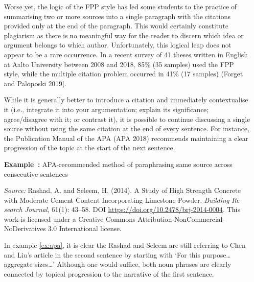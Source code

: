 \documentclass[english, 12pt, a4paper, sci, utf8, a-2b, online]{aaltothesis}
\begin{document}
Worse yet, the logic of the FPP style has led some students to the practice of 
summarising two or more sources into a single paragraph with the citations 
provided only at the end of the paragraph. This would certainly constitute 
plagiarism as there is no meaningful way for the reader to discern which idea or
argument belongs to which author. Unfortunately, this logical leap does not 
appear to be a rare occurrence. In a recent survey of 41 theses written in 
English at Aalto University between 2008 and 2018, 85\% (35 samples) used the 
FPP style, while the multiple citation problem occurred in 41\% (17 samples) 
(Forget and Paloposki 2019).

While it is generally better to introduce a citation and immediately 
contextualise it (i.e., integrate it into your argumentation; explain its 
significance; agree/disagree with it; or contrast it), it is possible to 
continue discussing a single source without using the same citation at the end 
of every sentence. For instance, the Publication Manual of the APA (APA 2018) 
recommends maintaining a clear progression of the topic at the start of the next
sentence.

\vspace{1em}
\noindent
{}
\textsf{\textbf{Example~\theexample:}} \label{ex:apa}APA-recommended method of 
paraphrasing same source across consecutive sentences 

\vspace{1ex}
\noindent
{}

\vspace{1ex}
\noindent
\textit{Source:} Rashad, A. and Seleem, H. (2014). A Study of High Strength 
Concrete with Moderate Cement Content Incorporating Limestone Powder. 
\textit{Building Re-search Journal}, 61(1): 43--58. 
DOI \url{https://doi.org/10.2478/brj-2014-0004}. 
This work is licensed under a Creative Commons 
Attribution-NonCommercial-NoDerivatives 3.0 International license.

\vspace{1em}
In example \ref{ex:apa}, it is clear the Rashad and Seleem are still referring 
to Chen and Liu’s article in the second sentence by starting with ‘For this 
purpose\ldots aggregate sizes\ldots’ Although one would suffice, both noun 
phrases are clearly connected by topical progression to the narrative of the 
first sentence.
\end{document}
